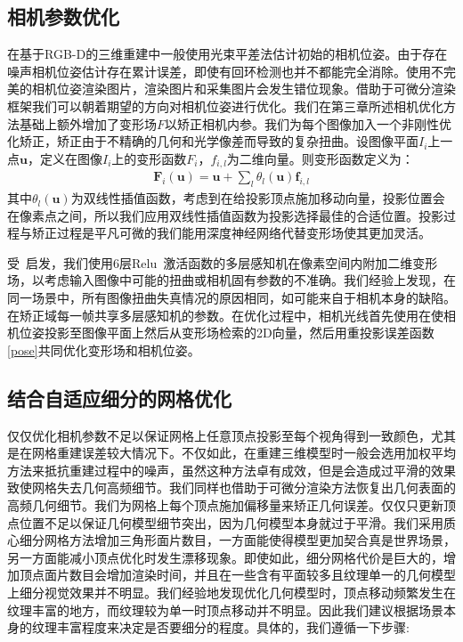 \subsection{相机参数优化}
在基于RGB-D的三维重建中一般使用光束平差法估计初始的相机位姿。由于存在噪声相机位姿估计存在累计误差，即使有回环检测也并不都能完全消除。使用不完美的相机位姿渲染图片，渲染图片和采集图片会发生错位现象。借助于可微分渲染框架我们可以朝着期望的方向对相机位姿进行优化。我们在第三章所述相机优化方法基础上额外增加了变形场$F$以矫正相机内参。我们为每个图像加入一个非刚性优化矫正，矫正由于不精确的几何和光学像差而导致的复杂扭曲。设图像平面$I_i$上一点$\mathbf{u}$，定义在图像$I_i$上的变形函数$F_i$，$f_{i,l}$为二维向量。则变形函数定义为：
\begin{align}
	\mathbf{F}_{i}(\mathbf{u})=\mathbf{u}+\sum_{l} \theta_{l}(\mathbf{u}) \mathbf{f}_{i, l}
\end{align}
其中$\theta_{l}(\mathbf{u})$为双线性插值函数，考虑到在给投影顶点施加移动向量，投影位置会在像素点之间，所以我们应用双线性插值函数为投影选择最佳的合适位置。投影过程与矫正过程是平凡可微的我们能用深度神经网络代替变形场使其更加灵活。
\par
受~\cite{DejanAzinovic2021NeuralRS}启发，我们使用6层Relu~\cite{agarap2018deep}激活函数的多层感知机在像素空间内附加二维变形场，以考虑输入图像中可能的扭曲或相机固有参数的不准确。我们经验上发现，在同一场景中，所有图像扭曲失真情况的原因相同，如可能来自于相机本身的缺陷。在矫正域每一帧共享多层感知机的参数。在优化过程中，相机光线首先使用在使相机位姿投影至图像平面上然后从变形场检索的2D向量，然后用重投影误差函数\eqref{pose}共同优化变形场和相机位姿。


\subsection{结合自适应细分的网格优化}
仅仅优化相机参数不足以保证网格上任意顶点投影至每个视角得到一致颜色，尤其是在网格重建误差较大情况下。不仅如此，在重建三维模型时一般会选用加权平均方法来抵抗重建过程中的噪声，虽然这种方法卓有成效，但是会造成过平滑的效果致使网格失去几何高频细节。我们同样也借助于可微分渲染方法恢复出几何表面的高频几何细节。我们为网格上每个顶点施加偏移量来矫正几何误差。仅仅只更新顶点位置不足以保证几何模型细节突出，因为几何模型本身就过于平滑。我们采用质心细分网格方法增加三角形面片数目，一方面能使得模型更加契合真是世界场景，另一方面能减小顶点优化时发生漂移现象。即使如此，细分网格代价是巨大的，增加顶点面片数目会增加渲染时间，并且在一些含有平面较多且纹理单一的几何模型上细分视觉效果并不明显。我们经验地发现优化几何模型时，顶点移动频繁发生在纹理丰富的地方，而纹理较为单一时顶点移动并不明显。因此我们建议根据场景本身的纹理丰富程度来决定是否要细分的程度。具体的，我们遵循一下步骤:

